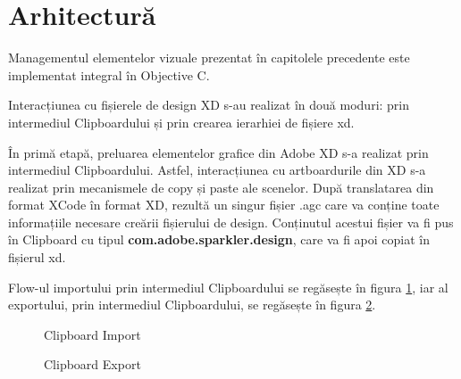 \section{Arhitectură}

Managementul elementelor vizuale prezentat în capitolele precedente este implementat integral în Objective C. 

Interacțiunea cu fișierele de design XD s-au realizat în două moduri: prin intermediul Clipboardului și prin crearea ierarhiei de fișiere xd.

În primă etapă, preluarea elementelor grafice din Adobe XD s-a realizat prin intermediul Clipboardului. Astfel, interacțiunea cu artboardurile din XD s-a realizat prin mecanismele de copy și paste ale scenelor.
După translatarea din format XCode în format XD, rezultă un singur fișier .agc care va conține toate informațiile necesare creării fișierului de design. Conținutul acestui fișier va fi pus în Clipboard cu tipul \textbf{com.adobe.sparkler.design}, care va fi apoi copiat în fișierul xd.

Flow-ul importului prin intermediul Clipboardului se regăsește în figura \ref{fig:Clipboard Import}, iar al exportului, prin intermediul Clipboardului, se regăsește în figura \ref{fig:Clipboard Export}.


\begin{figure}[!htbp]
\centering
{}
\caption{Clipboard Import} \label{fig:Clipboard Import}
\end{figure}

\begin{figure}[!htbp]
\centering
{}
\caption{Clipboard Export} \label{fig:Clipboard Export}
\end{figure}


